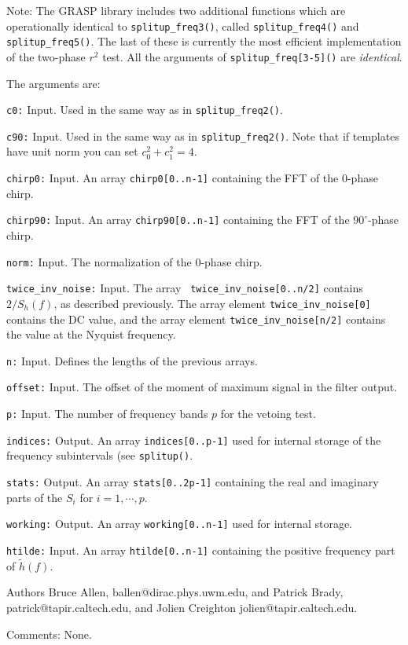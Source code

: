 Note: The GRASP library includes two additional functions which are
operationally identical to {\tt splitup\_freq3()}, called
{\tt splitup\_freq4()} and {\tt splitup\_freq5()}.  The last of
these is currently the most efficient implementation of the two-phase
$r^2$ test.  All the arguments of {\tt splitup\_freq[3-5]()} are
{\it identical}.

The arguments are:
\begin{description}
\item{\tt c0:} Input.  Used in the same way as in {\tt splitup\_freq2()}. 
\item{\tt c90:} Input.  Used in the same way as in {\tt splitup\_freq2()}.  Note that
 if templates have unit norm you can set $c_0^2 + c_1^2 = 4$.
\item{\tt chirp0:} Input.  An array {\tt chirp0[0..n-1]} containing 
the FFT of the 0-phase chirp.
\item{\tt chirp90:} Input.  An array {\tt chirp90[0..n-1]}
containing the FFT of the $90^\circ$-phase chirp.
\item{\tt norm:} Input.  The normalization of the 0-phase chirp.
\item{\tt twice\_inv\_noise:} Input.  The array {\tt
twice\_inv\_noise[0..n/2]} contains $2/S_h(f)$, as described previously.
The array element {\tt twice\_inv\_noise[0]} contains the DC value,
and the array element {\tt twice\_inv\_noise[n/2]} contains the value 
at the Nyquist frequency.
\item{\tt n:} Input.  Defines the lengths of the previous arrays.
\item{\tt offset:} Input.  The offset of the moment of maximum signal 
in the filter output.
\item{\tt p:} Input.  The number of frequency bands $p$ for the vetoing test.
\item{\tt indices:} Output.  An array {\tt indices[0..p-1]} used for
internal storage of the frequency subintervals (see {\tt splitup()}.
\item{\tt stats:} Output.  An array {\tt stats[0..2p-1]} containing
the real and imaginary parts of the $S_i$ for $i=1,\cdots,p$.
\item{\tt working:} Output.  An array {\tt working[0..n-1]} used for 
internal storage.
\item{\tt htilde:} Input.  An array {\tt htilde[0..n-1]} containing 
the positive frequency part of $\tilde h(f)$.
\end{description}
\begin{description}
\item{Authors}
Bruce Allen, ballen@dirac.phys.uwm.edu,
and Patrick Brady,  patrick@tapir.caltech.edu,
and Jolien Creighton jolien@tapir.caltech.edu.
\item{Comments:}
None.
\end{description}
\clearpage

